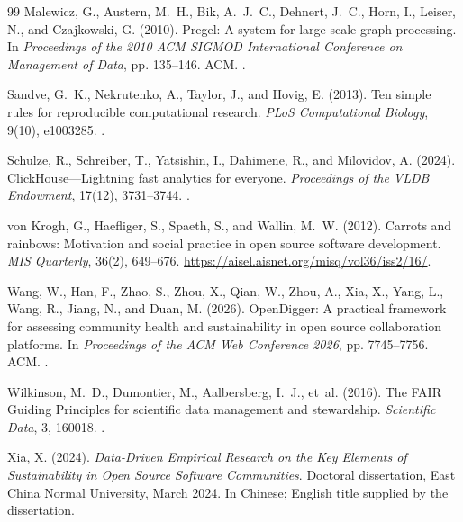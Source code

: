 \clearpage
\begingroup
\renewcommand{\bibsection}{\section*{References\enspace{\normalfont\sffamily\fontsize{11}{14}\selectfont continued}}}
\begin{thebibliography}{99}
Malewicz, G., Austern, M.~H., Bik, A.~J.~C., Dehnert, J.~C., Horn, I., Leiser, N., and Czajkowski, G. (2010).
Pregel: A system for large-scale graph processing.
In \emph{Proceedings of the 2010 ACM SIGMOD International Conference on Management of Data}, pp. 135--146. ACM.
.

Sandve, G.~K., Nekrutenko, A., Taylor, J., and Hovig, E. (2013).
Ten simple rules for reproducible computational research.
\emph{PLoS Computational Biology}, 9(10), e1003285.
.

Schulze, R., Schreiber, T., Yatsishin, I., Dahimene, R., and Milovidov, A. (2024).
ClickHouse---Lightning fast analytics for everyone.
\emph{Proceedings of the VLDB Endowment}, 17(12), 3731--3744.
.

von Krogh, G., Haefliger, S., Spaeth, S., and Wallin, M.~W. (2012).
Carrots and rainbows: Motivation and social practice in open source software development.
\emph{MIS Quarterly}, 36(2), 649--676.
\url{https://aisel.aisnet.org/misq/vol36/iss2/16/}.

Wang, W., Han, F., Zhao, S., Zhou, X., Qian, W., Zhou, A., Xia, X., Yang, L., Wang, R., Jiang, N., and Duan, M. (2026).
OpenDigger: A practical framework for assessing community health and sustainability in open source collaboration platforms.
In \emph{Proceedings of the ACM Web Conference 2026}, pp. 7745--7756. ACM.
.

Wilkinson, M.~D., Dumontier, M., Aalbersberg, I.~J., et~al. (2016).
The FAIR Guiding Principles for scientific data management and stewardship.
\emph{Scientific Data}, 3, 160018.
.

Xia, X. (2024).
\emph{Data-Driven Empirical Research on the Key Elements of Sustainability in Open Source Software Communities}.
Doctoral dissertation, East China Normal University, March 2024. In Chinese; English title supplied by the dissertation.


\end{thebibliography}
